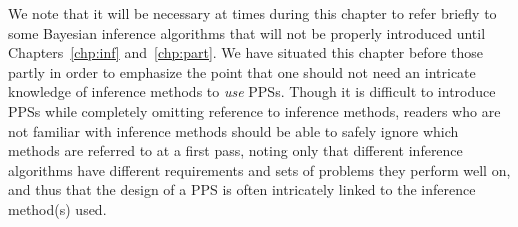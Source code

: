 We note that it will be necessary at times during this chapter to refer briefly to some Bayesian inference
algorithms that will not be properly introduced until Chapters~\ref{chp:inf} and~\ref{chp:part}.  
We have situated this chapter before those partly in order to emphasize the point that one should not 
need an intricate knowledge of inference methods to \emph{use} PPSs.  Though it is difficult
to introduce PPSs while completely omitting reference to inference methods, readers who
are not familiar with inference methods should be able to safely ignore which methods are referred to
at a first pass, noting only that different inference algorithms have different requirements and sets 
of problems they perform well on, and thus that the design of a PPS is often intricately linked to the inference
method(s) used.






%
%
